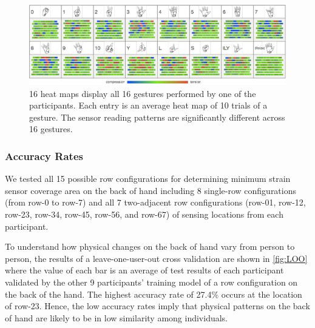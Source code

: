 \documentclass{sigchi}
\begin{document}
\begin{figure}
 \begin{center}
  \includegraphics[width=2\columnwidth]{figures/user16GesturesSV_v3.pdf}
  \caption{ 16 heat maps display all 16 gestures performed by one of the participants. Each entry is an average heat map of 10 trials of a gesture. The sensor reading patterns are significantly different across 16 gestures.
  }
  \label{fig:user16GesturesSV}
  \end{center}
\end{figure}

\subsubsection{Accuracy Rates}
We tested all 15 possible row configurations for determining minimum strain sensor coverage area on the back of hand including 8 single-row configurations (from row-0 to row-7) and all 7 two-adjacent row configurations (row-01, row-12, row-23, row-34, row-45, row-56, and row-67) of sensing locations from each participant.

To understand how physical changes on the back of hand vary from person to person, the results of a leave-one-user-out cross validation are shown in \autoref{fig:LOO} where the value of each bar is an average of test results of each participant validated by the other 9 participants' training model of a row configuration on the back of the hand. The highest accuracy rate of 27.4\% occurs at the location of row-23. Hence, the low accuracy rates imply that physical patterns on the back of hand are likely to be in low similarity among individuals.
\end{document}
